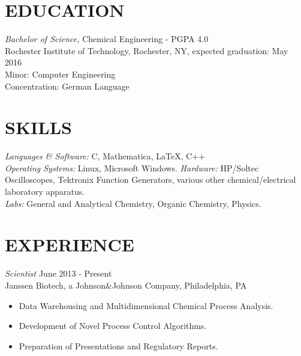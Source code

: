 \documentclass[line,margin]{res}
\begin{document}
\address{3241 Nathaniel Rochester Hall, Rochester, NY 14623}
\address{(315) 391-7268 - tmw4661@rit.edu}

\begin{resume}
 
\section{EDUCATION} {\sl Bachelor of Science,} Chemical Engineering - PGPA 4.0 \\
                Rochester Institute of Technology, Rochester, NY, 
                expected graduation: May 2016 \\
                Minor: Computer Engineering \\
                Concentration: German Language \\
\section{SKILLS} {\sl Languages \& Software:} C, Mathematica,
						\LaTeX, C++\\
                {\sl Operating Systems:} Linux, Microsoft Windows.
				{\sl Hardware:} HP/Soltec Oscilloscopes, Tektronix Function Generators, various other chemical/electrical laboratory apparatus.\\
				{\sl Labs:} General and Analytical Chemistry, Organic Chemistry, Physics.

\section{EXPERIENCE} {\sl Scientist} \hfill June 2013 - Present \\
		Janssen Biotech, a Johnson\&Johnson Company,
		Philadelphia, PA
		\begin{itemize}  \itemsep -2pt
		\item   Data Warehousing and Multidimensional Chemical Process Analysis.
		\item   Development of Novel Process Control Algorithms.
		\item   Preparation of Presentations and Regulatory Reports.
		\end{itemize}


\end{resume}
\end{document}
